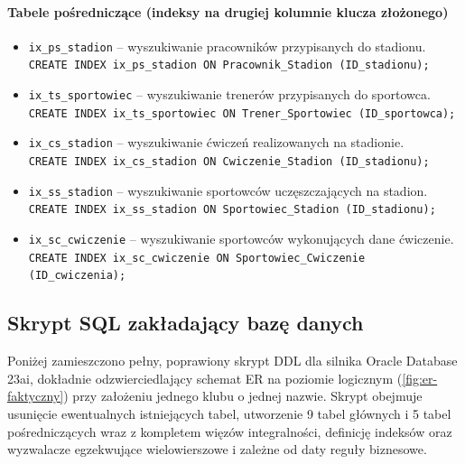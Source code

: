 \documentclass[11pt,a4paper]{article}
\begin{document}
\paragraph{Tabele pośredniczące (indeksy na drugiej kolumnie klucza złożonego)}
\begin{itemize}
    \item \texttt{ix\_ps\_stadion} -- wyszukiwanie pracowników przypisanych do stadionu.\\
    \texttt{CREATE INDEX ix\_ps\_stadion ON Pracownik\_Stadion (ID\_stadionu);}
    \item \texttt{ix\_ts\_sportowiec} -- wyszukiwanie trenerów przypisanych do sportowca.\\
    \texttt{CREATE INDEX ix\_ts\_sportowiec ON Trener\_Sportowiec (ID\_sportowca);}
    \item \texttt{ix\_cs\_stadion} -- wyszukiwanie ćwiczeń realizowanych na stadionie.\\
    \texttt{CREATE INDEX ix\_cs\_stadion ON Cwiczenie\_Stadion (ID\_stadionu);}
    \item \texttt{ix\_ss\_stadion} -- wyszukiwanie sportowców uczęszczających na stadion.\\
    \texttt{CREATE INDEX ix\_ss\_stadion ON Sportowiec\_Stadion (ID\_stadionu);}
    \item \texttt{ix\_sc\_cwiczenie} -- wyszukiwanie sportowców wykonujących dane ćwiczenie.\\
    \texttt{CREATE INDEX ix\_sc\_cwiczenie ON Sportowiec\_Cwiczenie (ID\_cwiczenia);}
\end{itemize}

\clearpage
\subsection{Skrypt SQL zakładający bazę danych}
Poniżej zamieszczono pełny, poprawiony skrypt DDL dla silnika Oracle Database 23ai, dokładnie odzwierciedlający schemat ER na poziomie logicznym (\cref{fig:er-faktyczny}) przy założeniu jednego klubu o jednej nazwie. Skrypt obejmuje usunięcie ewentualnych istniejących tabel, utworzenie 9 tabel głównych i 5 tabel pośredniczących wraz z kompletem więzów integralności, definicję indeksów oraz wyzwalacze egzekwujące wielowierszowe i zależne od daty reguły biznesowe.
\end{document}
